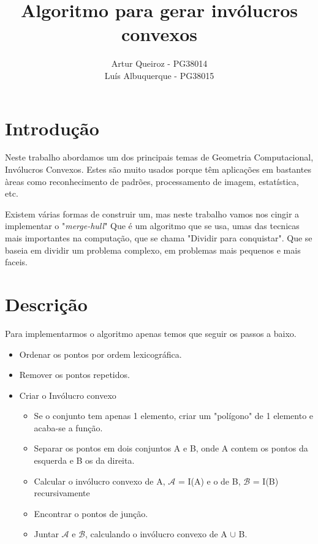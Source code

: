 \documentclass[11pt]{article}
\title{Algoritmo para gerar invólucros convexos}
\author{Artur Queiroz - PG38014\\Luís Albuquerque - PG38015}
\begin{document}
\maketitle

\section{Introdução}
Neste trabalho abordamos um dos principais temas de Geometria 
Computacional, Invólucros Convexos.
Estes são muito usados porque têm aplicações em bastantes àreas
como reconhecimento de padrões, processamento de imagem, 
estatística, etc.

Existem várias formas de construir um, mas neste trabalho vamos
nos cingir a implementar o "\textit{merge-hull}"
Que é um algoritmo que se usa, umas das tecnicas mais importantes
na computação, que se chama "Dividir para conquistar".
Que se baseia em dividir um problema complexo, em problemas mais 
pequenos e mais faceis.

\section{Descrição}
Para implementarmos o algoritmo apenas temos que seguir os passos
a baixo.

\begin{itemize}
    \item Ordenar os pontos por ordem lexicográfica.
    \item Remover os pontos repetidos.
    \item Criar o Invólucro convexo
    \begin{itemize}
        \item Se o conjunto tem apenas 1 elemento, criar um "polígono"
            de 1 elemento e acaba-se a função.
        \item Separar os pontos em dois conjuntos A e B, 
            onde A contem os pontos da esquerda e B os da direita.
        \item Calcular o invólucro convexo de A, 
            $\mathcal{A}$ = I(A) e o de B, $\mathcal{B}$ = I(B) recursivamente
        \item Encontrar o pontos de junção.
        \item Juntar $\mathcal{A}$ e $\mathcal{B}$, 
            calculando o invólucro convexo de A $\cup$ B.
    \end{itemize}
\end{itemize}
\end{document}
